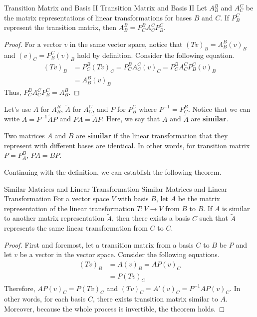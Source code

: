 \documentclass[../main.tex]{subfiles}
\begin{document}
\begin{theorem}{Transition Matrix and Basis II}
{Transition Matrix and Basis II}
Let $A_B^B$ and $A_C^C$ be the matrix representations of linear
transformations for bases $B$ and $C$. If $P_B^C$ represent the
transition matrix, then $A_B^B = P_C^B A_C^C P_B^C$.
\end{theorem}
\begin{proof}
For a vector $v$ in the same vector space, notice that $(Tv)_B =
A_B^B (v)_B$ and $(v)_C = P_B^C (v)_B$ hold by definition.
Consider the following equation.
\begin{align*}
    (Tv)_B
    &= P_C^B (Tv)_C = P_C^B A_C^C (v)_C
        = P_C^B A_C^C P_B^C (v)_B \\
    &= A_B^B (v)_B
\end{align*}
Thus, $P_C^B A_C^C P_B^C = A_B^B$.
\end{proof}

Let's use $A$ for $A_B^B$, $\tilde{A}$ for $A_C^C$, and $P$ for
$P_B^C$ where $P^{-1} = P_C^B$. Notice that we can write $A = P^{-1}
\tilde{A} P$ and $PA = \tilde{A} P$. Here, we say that $A$ and
$\tilde{A}$ are \textbf{similar}.

\begin{definition}
Two matrices $A$ and $B$ are \textbf{similar} if the linear
transformation that they represent with different bases are identical.
In other words, for transition matrix $P = P_A^B$, $PA = BP$.
\end{definition}

Continuing with the definition, we can establish the following
theorem.

\begin{theorem}{Similar Matrices and Linear Transformation}
{Similar Matrices and Linear Transformation}
For a vector space $V$ with basis $B$, let $A$ be the matrix
representation of the linear transformation $T: V \to V$ from $B$ to
$B$. If $A$ is similar to another matrix representation $\tilde{A}$,
then there exists a basis $C$ such that $\tilde{A}$ represents the
same linear transformation from $C$ to $C$.
\end{theorem}
\begin{proof}
First and foremost, let a transition matrix from a basis $C$ to $B$
be $P$ and let $v$ be a vector in the vector space. Consider the
following equations.
\begin{align*}
    (Tv)_B
    &= A (v)_B = AP (v)_C \\
    &= P (Tv)_C
\end{align*}
Therefore, $AP (v)_C = P (Tv)_C$ and $(Tv)_C = A' (v)_C =
P^{-1} A P (v)_C$. In other words, for each basis $C$, there exists
transition matrix similar to $A$. Moreover, because the whole
process is invertible, the theorem holds.
\end{proof}
\end{document}
